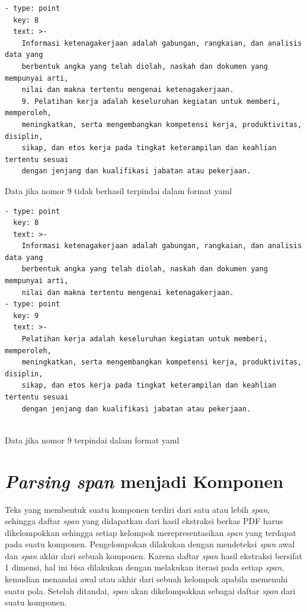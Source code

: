 \begin{listing}[H]
  \begin{verbatim}
- type: point
  key: 8
  text: >-
    Informasi ketenagakerjaan adalah gabungan, rangkaian, dan analisis data yang
    berbentuk angka yang telah diolah, naskah dan dokumen yang mempunyai arti,
    nilai dan makna tertentu mengenai ketenagakerjaan.
    9. Pelatihan kerja adalah keseluruhan kegiatan untuk memberi, memperoleh,
    meningkatkan, serta mengembangkan kompetensi kerja, produktivitas, disiplin,
    sikap, dan etos kerja pada tingkat keterampilan dan keahlian tertentu sesuai
    dengan jenjang dan kualifikasi jabatan atau pekerjaan.
\end{verbatim}
  \caption{Data jika nomor 9 tidak berhasil terpindai dalam format yaml}
  \label{lst:no-9-tidak-terpindai}
\end{listing}


\begin{listing}[H]
  \begin{verbatim}
- type: point
  key: 8
  text: >-
    Informasi ketenagakerjaan adalah gabungan, rangkaian, dan analisis data yang
    berbentuk angka yang telah diolah, naskah dan dokumen yang mempunyai arti,
    nilai dan makna tertentu mengenai ketenagakerjaan.
- type: point
  key: 9
  text: >-
    Pelatihan kerja adalah keseluruhan kegiatan untuk memberi, memperoleh,
    meningkatkan, serta mengembangkan kompetensi kerja, produktivitas, disiplin,
    sikap, dan etos kerja pada tingkat keterampilan dan keahlian tertentu sesuai
    dengan jenjang dan kualifikasi jabatan atau pekerjaan.
  
\end{verbatim}
  \caption{Data jika nomor 9 terpindai dalam format yaml}
  \label{lst:no-9-terpindai}
\end{listing}

\section{\textit{Parsing span} menjadi Komponen}
\label{pengelompokan-span-menjadi-komponen}


Teks yang membentuk suatu komponen terdiri dari satu atau lebih \textit{span}, sehingga daftar
\textit{span} yang didapatkan dari hasil ekstraksi berkas PDF harus dikelompokkan sehingga setiap
kelompok merepresentasikan \textit{span} yang terdapat pada suatu komponen. Pengelompokan dilakukan
dengan mendeteksi \textit{span} awal dan \textit{span} akhir dari sebuah komponen. Karena daftar
\textit{span} hasil ekstraksi bersifat 1 dimensi, hal ini bisa dilakukan dengan melakukan iterasi
pada setiap \textit{span}, kemudian menandai awal atau akhir dari sebuah kelompok apabila memenuhi
suatu pola. Setelah ditandai, \textit{span} akan dikelompokkan sebagai daftar \textit{span} dari
suatu komponen.

